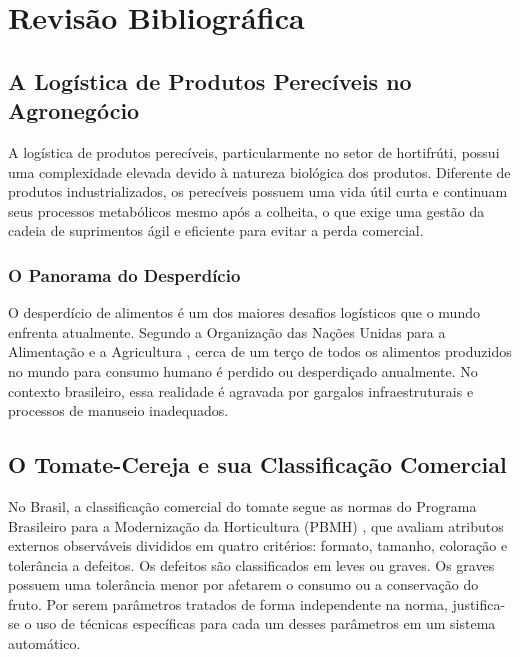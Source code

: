 \chapter{Revisão Bibliográfica}\label{cap:revisao}

\section{A Logística de Produtos Perecíveis no Agronegócio}

A logística de produtos perecíveis, particularmente no setor de hortifrúti, possui uma complexidade elevada devido à natureza biológica dos produtos. Diferente de produtos industrializados, os perecíveis possuem uma vida útil curta e continuam seus processos metabólicos mesmo após a colheita, o que exige uma gestão da cadeia de suprimentos ágil e eficiente para evitar a perda comercial.

\subsection{O Panorama do Desperdício}

O desperdício de alimentos é um dos maiores desafios logísticos que o mundo enfrenta atualmente. Segundo a Organização das Nações Unidas para a Alimentação e a Agricultura \cite{FAO2011}, cerca de um terço de todos os alimentos produzidos no mundo para consumo humano é perdido ou desperdiçado anualmente. No contexto brasileiro, essa realidade é agravada por gargalos infraestruturais e processos de manuseio inadequados.

\section{O Tomate-Cereja e sua Classificação Comercial}

No Brasil, a classificação comercial do tomate segue as normas do Programa Brasileiro para a Modernização da Horticultura (PBMH) \cite{ceagesp2003}, que avaliam atributos externos observáveis divididos em quatro critérios: formato, tamanho, coloração e tolerância a defeitos. Os defeitos são classificados em leves ou graves. Os graves possuem uma tolerância menor por afetarem o consumo ou a conservação do fruto. Por serem parâmetros tratados de forma independente na norma, justifica-se o uso de técnicas específicas para cada um desses parâmetros em um sistema automático.

